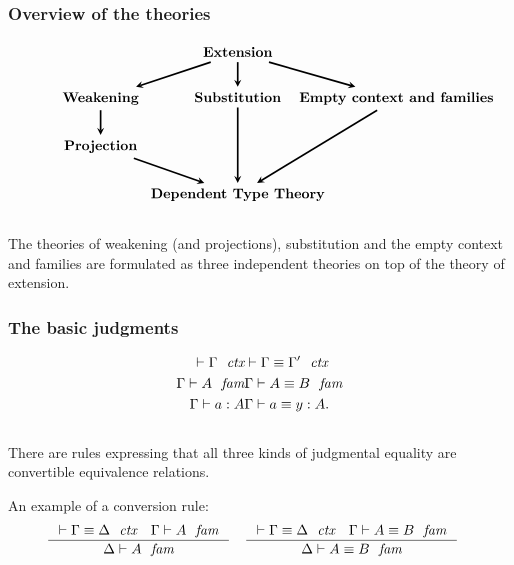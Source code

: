 \documentclass{beamer}
\begin{document}
\begin{frame}
\frametitle{\bf Overview of the theories}
\begin{equation*}
\begin{tikzcd}[ampersand replacement=\&,column sep=0em]
{} \& \textbf{Extension} \ar[very thick,-stealth]{dr} \ar[very thick,-stealth]{d} \ar[very thick,-stealth]{dl}
  \\
\textbf{Weakening} \ar[very thick,-stealth]{d} \& \textbf{Substitution} \ar[very thick,-stealth]{dd} \& \makebox[3cm]{\textbf{Empty context and families}} \ar[very thick,-stealth]{ddl}
\\
\textbf{Projection} \ar[very thick,-stealth]{dr}
\\
{} \& \textbf{Dependent Type Theory}
\end{tikzcd}
\end{equation*}
\\[2em]
\pause
The theories of weakening (and projections), substitution and the empty context and families are formulated as three independent theories on top of the theory of extension.
\end{frame}

\begin{frame}
\frametitle{\bf The basic judgments}
\begin{align*}
\jalign\jctx{\Gamma} 
& \jalign\jctxeq{\Gamma}{\Gamma'}
  \\
\jalign\jfam{\Gamma}{A} 
& \jalign\jfameq{\Gamma}{A}{B}
  \\
\jalign\jterm{\Gamma}{A}{a} 
& \jalign\jtermeq{\Gamma}{A}{a}{y}.
\end{align*}
\\[\baselineskip]
There are rules expressing that all three kinds of judgmental equality are
convertible equivalence relations.

\pause
An example of a conversion rule:
\begin{align*}
& \inference
  { \jctxeq{\Gamma}{\Delta}
    \jfam{\Gamma}{A}
    }
  { \jfam{\Delta}{A}
    }
& & \inference
    { \jctxeq{\Gamma}{\Delta}
      \jfameq{\Gamma}{A}{B}
      }
    { \jfameq{\Delta}{A}{B}
      }
\end{align*}
\end{frame}
\end{document}
